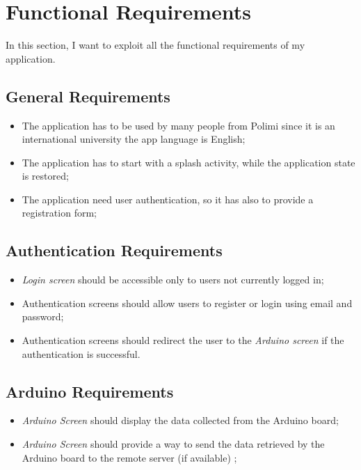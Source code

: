 \section{Functional Requirements}
In this section, I want to exploit all the functional requirements of my application.

\subsection{General Requirements}
\begin{itemize}
    \item The application has to be used by many people from Polimi since it is an international university the app language is English;
    \item The application has to start with a splash activity, while the application state is restored;
    \item The application need user authentication, so it has also to provide a registration form;
\end{itemize}

\subsection{Authentication Requirements}
\begin{itemize}
    \item \textit{Login screen} should be accessible only to users not currently logged in;
    \item Authentication screens should allow users to register or login using email and password;
    \item Authentication screens should redirect the user to the \textit{Arduino screen} if the authentication is successful.
\end{itemize}
    
\subsection{Arduino Requirements}
\begin{itemize}
    \item \textit{Arduino Screen} should display the data collected from the Arduino board;
    \item \textit{Arduino Screen} should provide a way to send the data retrieved by the Arduino board to the remote server (if available) ;
\end{itemize}
    
